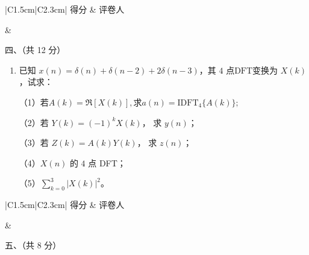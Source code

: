 \documentclass[UTF8,a4paper,12pt]{ctexart}
\begin{document}
\newpage

\noindent
\begin{minipage}[t]{0.25\textwidth}
\renewcommand{\arraystretch}{1.5}
\begin{tabular}{|C{1.5cm}|C{2.3cm}|}
\hline
得分 & 评卷人 \\
\hline
\rule{0pt}{0.8cm}&  \\
\hline
\end{tabular}
\end{minipage}
\begin{minipage}[t]{0.72\textwidth}
\vspace{0.2cm}
\begin{center}
{\heiti 四、（共 12 分）}
\end{center}
\end{minipage}

\vspace{1.2em}

\begin{enumerate}[label={}, leftmargin=2em, itemsep=1.6em]

\item 已知 $x(n)=\delta(n)+\delta(n-2)+2\delta(n-3)$，其 $4$ 点$\mathrm{DFT}$变换为
$X(k)$，试求：

\vspace{0.6em}

（1）若$A(k)=\Re[X(k)],$求$a(n)=\mathrm{IDFT}_4\{A(k)\};$


\vspace{0.6em}

（2）若 $\displaystyle Y(k)=(-1)^kX(k)$，
求 $\displaystyle y(n)$；

\vspace{0.6em}

（3）若 $\displaystyle Z(k)=A(k)Y(k)$，
求 $\displaystyle z(n)$；

\vspace{0.6em}

（4）$X(n)$ 的 $4$ 点 DFT；

\vspace{0.6em}

（5）$\displaystyle \sum_{k=0}^{3}\left|X(k)\right|^2$。

\vspace{6cm}

\end{enumerate}

\noindent
\begin{minipage}[t]{0.25\textwidth}
\renewcommand{\arraystretch}{1.5}
\begin{tabular}{|C{1.5cm}|C{2.3cm}|}
\hline
得分 & 评卷人 \\
\hline
\rule{0pt}{0.8cm}&  \\
\hline
\end{tabular}
\end{minipage}
\begin{minipage}[t]{0.72\textwidth}
\vspace{0.2cm}
\begin{center}
{\heiti 五、（共 8 分）}
\end{center}
\end{minipage}
\end{document}
